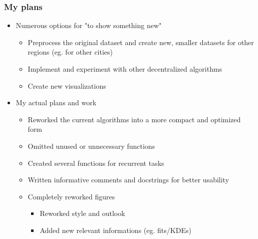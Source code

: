 \begin{frame}
\frametitle{My plans}

\begin{itemize}
	\item<1-> Numerous options for "to show something new"
	\begin{itemize}
		\item<1-> Preprocess the original dataset and create new, smaller datasets for other regions (eg. for other cities)
		\item<1-> Implement and experiment with other decentralized algorithms
		\item<1-> Create new visualizations
	\end{itemize}
	\item<1-> My actual plans and work
	\begin{itemize}
		\item<1-> Reworked the current algorithms into a more compact and optimized form
		\item<1-> Omitted unused or unnecessary functions
		\item<1-> Created several functions for recurrent tasks
		\item<1-> Written informative comments and docstrings for better usability
		\item<1-> Completely reworked figures
		\begin{itemize}
			\item<1-> Reworked style and outlook
			\item<1-> Added new relevant informations (eg. fits/KDEs)
		\end{itemize}
	\end{itemize}
\end{itemize}

\end{frame}